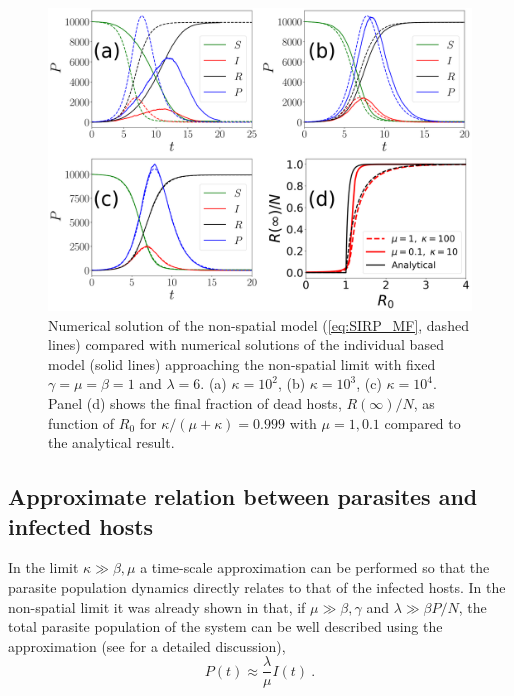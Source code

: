 \begin{figure}[H]
    \centering
    \includegraphics[width=\columnwidth]{Figures/MF_comparison.png}
    \caption{Numerical solution of the non-spatial model (\cref{eq:SIRP_MF},
        dashed lines) compared with numerical solutions of the individual based
        model
        (solid lines) approaching the non-spatial limit with fixed
        $\gamma=\mu=\beta=1$
        and $\lambda=6$. (a) $\kappa=10^2$, (b) $\kappa=10^3$, (c)
        $\kappa=10^4$. Panel
        (d) shows the final fraction of dead hosts, $R(\infty)/N$, as function
        of $R_0$
        for $\kappa/(\mu+\kappa)=0.999$ with $\mu=1,0.1$ compared to the
        analytical
        result.}
    \label{fig:MF_limit}
\end{figure}

\subsection{Approximate relation between parasites and infected hosts}

In the limit $\kappa\gg\beta,\mu$ a time-scale approximation can be
performed so that the parasite population dynamics directly relates to that of
the infected hosts. In the non-spatial limit it was already shown in
\cite{GimenezRomero2021} that, if  $\mu\gg\beta,\gamma$ and $\lambda\gg\beta
    P/N$, the total parasite population of the system can be well described
using
the approximation (see \cite{GimenezRomero2021} for a detailed discussion),
\begin{equation}\label{eq:P_approx_II}
    P(t)\approx \frac{\lambda}{\mu} I(t) \ .
\end{equation}


